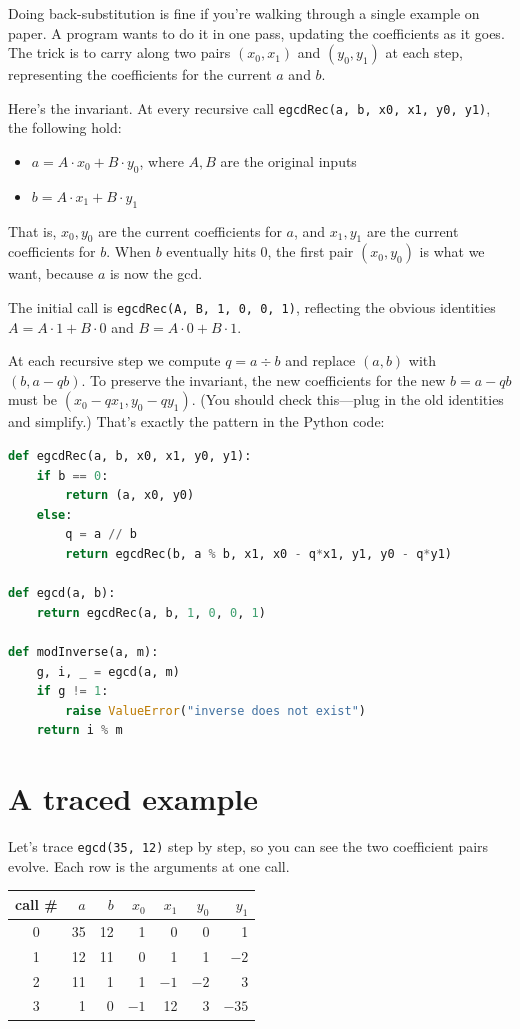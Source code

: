 \documentclass[11pt]{article}
\begin{document}
Doing back-substitution is fine if you're walking through a single example on paper. A program wants to do it in one pass, updating the coefficients as it goes. The trick is to carry along two pairs $(x_0, x_1)$ and $(y_0, y_1)$ at each step, representing the coefficients for the current $a$ and $b$.

Here's the invariant. At every recursive call \texttt{egcdRec(a, b, x0, x1, y0, y1)}, the following hold:
\begin{itemize}
  \item $a = A \cdot x_0 + B \cdot y_0$, where $A, B$ are the original inputs
  \item $b = A \cdot x_1 + B \cdot y_1$
\end{itemize}
That is, $x_0, y_0$ are the current coefficients for $a$, and $x_1, y_1$ are the current coefficients for $b$. When $b$ eventually hits $0$, the first pair $(x_0, y_0)$ is what we want, because $a$ is now the gcd.

The initial call is \texttt{egcdRec(A, B, 1, 0, 0, 1)}, reflecting the obvious identities $A = A \cdot 1 + B \cdot 0$ and $B = A \cdot 0 + B \cdot 1$.

At each recursive step we compute $q = a \div b$ and replace $(a, b)$ with $(b, a - q b)$. To preserve the invariant, the new coefficients for the new $b = a - q b$ must be $(x_0 - q x_1, y_0 - q y_1)$. (You should check this---plug in the old identities and simplify.) That's exactly the pattern in the Python code:

\begin{lstlisting}[language=Python]
def egcdRec(a, b, x0, x1, y0, y1):
    if b == 0:
        return (a, x0, y0)
    else:
        q = a // b
        return egcdRec(b, a % b, x1, x0 - q*x1, y1, y0 - q*y1)

def egcd(a, b):
    return egcdRec(a, b, 1, 0, 0, 1)

def modInverse(a, m):
    g, i, _ = egcd(a, m)
    if g != 1:
        raise ValueError("inverse does not exist")
    return i % m
\end{lstlisting}

\section{A traced example}

Let's trace \texttt{egcd(35, 12)} step by step, so you can see the two coefficient pairs evolve. Each row is the arguments at one call.

\begin{center}
\begin{tabular}{c|r|r|r|r|r|r}
\toprule
call \# & $a$ & $b$ & $x_0$ & $x_1$ & $y_0$ & $y_1$ \\
\midrule
0 & 35 & 12 & 1 & 0 & 0 & 1 \\
1 & 12 & 11 & 0 & 1 & 1 & $-2$ \\
2 & 11 & 1  & 1 & $-1$ & $-2$ & 3 \\
3 & 1  & 0  & $-1$ & 12 & 3 & $-35$ \\
\bottomrule
\end{tabular}
\end{center}
\end{document}
